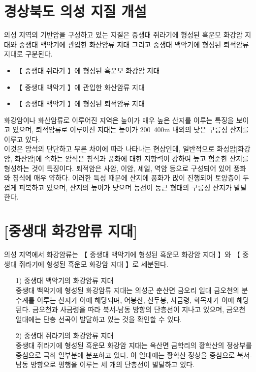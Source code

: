 \documentclass[12pt,a4paper]{book}
\newcommand{\SectionMargin}			{\newpage  \null \vskip 0cm}
\begin{document}
	\SectionMargin
	\section{경상북도 의성 지질 개설}
	\null



	의성 지역의 기반암을 구성하고 있는 지질은 중생대 쥐라기에 형성된 흑운모 화강암 지대와 
	중생대 백악기에 관입한 화산암류 지대 그리고 중생대 백악기에 형성된 퇴적암류 지대로 구분된다. \\

		\begin{itemize}[itemsep=0.0em]
		\item		【 중생대 쥐라기 】에 형성된 흑운모 화강암 지대
		\item		【 중생대 백악기 】에 관입한 화산암류 지대
		\item		【 중생대 백악기 】에 형성된 퇴적암류 지대
		\end{itemize}


화강암이나 화산암류로 이루어진 지역은 높이가 매우 높은 산지를 이루는 특징을 보이고 있으며, 퇴적암류로 이루어진 지대는 높이가 200~400m 내외의 낮은 구릉성 산지를 이루고 있다.\\

이것은 암석의 단단하고 무른 차이에 따라 나타나는 현상인데, 일반적으로 화성암[화강암, 화산암]에 속하는 암석은 침식과 풍화에 대한 저항력이 강하여 높고 험준한 산지를 형성하는 것이 특징이다. 퇴적암은 사암, 이암, 셰일, 역암 등으로 구성되어 있어 풍화와 침식에 매우 약하다. 이러한 특성 때문에 산지에 풍화가 많이 진행되어 토양층이 두껍게 피복하고 있으며, 산지의 높이가 낮으며 능선이 둥근 형태의 구릉성 산지가 발달한다.


	\SectionMargin
	\section{[중생대 화강암류 지대]}
	\null


의성 지역에서 화강암류는 【 중생대 백악기에 형성된 흑운모 화강암 지대 】와 【 중생대 쥐라기에 형성된 흑운모 화강암 지대 】로 세분된다. 

		\begin{itemize}[itemsep=0.0em]
		\item	[1)] 중생대 백악기의 화강암류 지대\\
				중생대 백악기에 형성된 화강암류 지대는 
				의성군 춘산면 금오리 일대 금오천의 분수계를 이루는 산지가 이에 해당되며, 
				어봉산, 산두봉, 사금령, 화목재가 이에 해당된다. 
				금오천과 사금령을 따라 북서-남동 방향의 단층선이 지나고 있으며, 
				금오천 일대에는 단층 선곡이 발달하고 있는 것을 확인할 수 있다.

		\item	[2)] 중생대 쥐라기의 화강암류 지대\\
				중생대 쥐라기에 형성된 흑운모 화강암 지대는 
				옥산면 금학리의 황학산의 정상부를 중심으로 극히 일부분에 분포하고 있다. 
				이 일대에는 황학산 정상을 중심으로 북서-남동 방향으로 평행을 이루는 
				세 개의 단층선이 발달하고 있다.
		\end{itemize}
\end{document}
